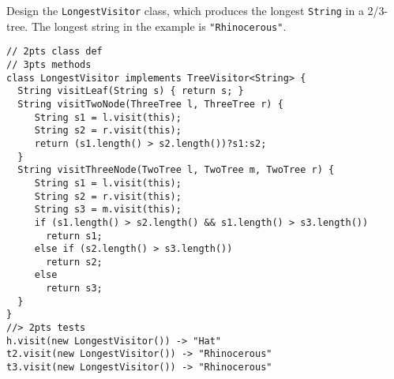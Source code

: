 \documentclass[12pt]{article}                   %
\newenvironment{solution}{\color{red}}{}
\begin{document}
\begin{problem}
\newpage

Design the \verb|LongestVisitor| class, which produces the longest
\verb|String| in a 2/3-tree.  The longest string in the example is
\verb|"Rhinocerous"|.  

\begin{solution}
\begin{verbatim}
// 2pts class def
// 3pts methods
class LongestVisitor implements TreeVisitor<String> {
  String visitLeaf(String s) { return s; }
  String visitTwoNode(ThreeTree l, ThreeTree r) { 
     String s1 = l.visit(this);
     String s2 = r.visit(this);
     return (s1.length() > s2.length())?s1:s2;
  }
  String visitThreeNode(TwoTree l, TwoTree m, TwoTree r) { 
     String s1 = l.visit(this);
     String s2 = r.visit(this);
     String s3 = m.visit(this);
     if (s1.length() > s2.length() && s1.length() > s3.length())
       return s1;
     else if (s2.length() > s3.length())
       return s2;
     else
       return s3;
  }
}
//> 2pts tests
h.visit(new LongestVisitor()) -> "Hat"
t2.visit(new LongestVisitor()) -> "Rhinocerous"
t3.visit(new LongestVisitor()) -> "Rhinocerous"
\end{verbatim}
\end{solution}

\newpage

\end{problem}
\end{document}
